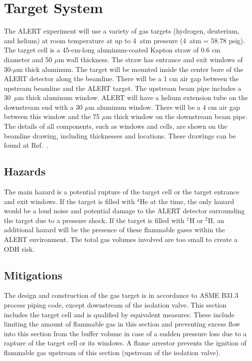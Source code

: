 \section{Target System}

The ALERT experiment will use a variety of gas targets (hydrogen, deuterium, and helium) at
room temperature at up to 4~atm pressure (4~atm = 58.78 psig). The target cell is a
45-cm-long aluminum-coated Kapton straw of 0.6 cm diameter and 50 $\mu$m wall thickness. The
straw has entrance and exit windows of 30-$\mu$m thick aluminum. The target will be mounted
inside the center bore of the ALERT detector along the beamline. There will be a 1 cm air gap
between the upstream beamline and the ALERT target. The upstream beam pipe includes a 30~$\mu$m
thick aluminum window. ALERT will have a helium extension tube on the downstream end with a
30 $\mu$m aluminum window. There will be a 4 cm air gap between this window and the 75 $\mu$m
thick window on the downstream beam pipe. The details of all components, such as windows and cells,
are shown on the beamline drawing, including thicknesses and locations. These drawings can be found
at Ref.~\cite{engineering-page}.

\subsection{Hazards} 

The main hazard is a potential rupture of the target cell or the target entrance and exit windows.
If the target is filled with $^4$He at the time, the only hazard would be a loud noise and potential
damage to the ALERT detector surrounding the target due to a pressure shock. If the target is filled
with $^1$H or $^2$H, an additional hazard will be the presence of these flammable gases within the
ALERT environment. The total gas volumes involved are too small to create a ODH risk.

\subsection{Mitigations}

The design and construction of the gas target is in accordance to ASME B31.3 process piping code, except
downstream of the isolation valve. This section includes the target cell and is qualified by equivalent
measures. These include limiting the amount of flammable gas in this section and preventing excess flow
into this section from the buffer volume in case of a sudden pressure loss due to a rapture of the target
cell or its windows. A flame arrestor prevents the ignition of flammable gas upstream of this section
(upstream of the isolation valve).

